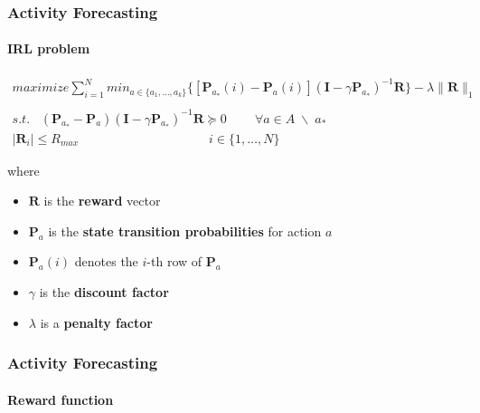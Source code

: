 \begin{frame}
	\frametitle{Activity Forecasting}
	\framesubtitle{IRL problem}
	
	\large
	
	\begin{eqnarray*}
		maximize \sum_{i=1}^N min_{a \in \{a_1, \ldots, a_k \}} \Big \{ [ \mathbf{P}_{a_*}(i) - \mathbf{P}_a(i) ] ( \mathbf{I} - \gamma \mathbf{P}_{a_*})^{-1} \mathbf{R} \Big \} - \lambda \| \mathbf{R} \|_1 \\ \\
		s.t. \;\;\; (\mathbf{P}_{a_*} - \mathbf{P}_a)(\mathbf{I} - \gamma \mathbf{P}_{a_*})^{-1} \mathbf{R} \succeq 0 \;\;\;\;\;\;\;\; \forall a \in A \; \backslash \; a_* \;\;\;\;\;\;\;\;\;\;\;\;\;\;\;\;\;\;\;\; \\
		| \mathbf{R}_i | \leq R_{max} \;\;\;\;\;\;\;\;\;\;\;\;\;\;\;\;\;\;\;\;\;\;\;\;\;\;\;\;\;\;\;\;\;\;\;\;\; i \in \{ 1, \ldots, N \} \;\;\;\;\;\;\;\;\;\;\;\;\,\,
	\end{eqnarray*}
	
	\vspace{0.2cm}
	
	where
	
	\begin{itemize}
		\item $ \mathbf{R} $ is the \textbf{reward} vector
		\item $ \mathbf{P}_a $ is the \textbf{state transition probabilities} for action
			  $ a $
		\item $ \mathbf{P}_a(i) $ denotes the $ i $-th row of $ \mathbf{P}_a $
		\item $ \gamma $ is the \textbf{discount factor}
		\item $ \lambda $ is a \textbf{penalty factor}
	\end{itemize}
\end{frame}

\begin{frame}
	\frametitle{Activity Forecasting}
	\framesubtitle{Reward function}
	
	\begin{center}
	\end{center}
\end{frame}
